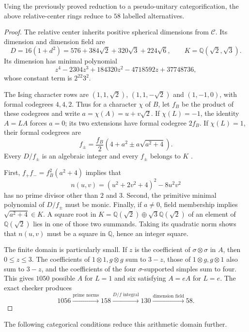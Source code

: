 \begin{proposition}\label{prop:1660-arithmetic-domain}
Using the previously proved reduction to a pseudo-unitary
categorification, the above relative-center rings reduce to $58$
labelled alternatives.
\end{proposition}
\begin{proof}
The relative center inherits positive spherical dimensions from
$\mathcal C$. Its dimension and dimension field are
\[
 D=16(1+d^2)=576+384\sqrt2+320\sqrt3+224\sqrt6,
 \qquad K=\mathbb Q(\sqrt2,\sqrt3).
\]
Its dimension has minimal polynomial
\[
 z^4-2304z^3+184320z^2-4718592z+37748736,
\]
whose constant term is $2^{22}3^2$.

The Ising character rows are $(1,1,\sqrt2)$, $(1,1,-\sqrt2)$ and
$(1,-1,0)$, with formal codegrees $4,4,2$. Thus for a character $\chi$
of $B$, let $f_B$ be the product of these codegrees and write
$a=\chi(A)=u+v\sqrt2$. If $\chi(L)=-1$, the identity $A=LA$ forces
$a=0$; its two extensions have formal codegree $2f_B$. If
$\chi(L)=1$, their formal codegrees are
\[
 f_\pm=\frac{f_B}{2}\left(4+a^2\pm a\sqrt{a^2+4}\right).
\]
Every $D/f_\pm$ is an algebraic integer and every $f_\pm$ belongs to
$K$ \cite[Corollaries 2.14--2.15]{Ostrik3}.

First, $f_+f_-=f_B^2(a^2+4)$ implies that
\[
 n(u,v)=(u^2+2v^2+4)^2-8u^2v^2
\]
has no prime divisor other than $2$ and $3$. Second, the primitive
minimal polynomial of $D/f_\pm$ must be monic. Finally, if $a\ne0$,
field membership implies $\sqrt{a^2+4}\in K$. A square root in
$K=\mathbb Q(\sqrt2)\oplus\sqrt3\mathbb Q(\sqrt2)$ of an element of
$\mathbb Q(\sqrt2)$ lies in one of those two summands. Taking its
quadratic norm shows that $n(u,v)$ must be a square in $\mathbb Q$,
hence an integer square.

The finite domain is particularly small. If $z$ is the coefficient of
$\sigma\otimes\sigma$ in $A$, then $0\le z\le3$. The coefficients
of $1\otimes1,g\otimes g$ sum to $3-z$, those of
$1\otimes g,g\otimes1$ also sum to $3-z$, and the coefficients of the
four $\sigma$-supported simples sum to four. This gives $1050$ possible
$A$ for $L=1$ and six satisfying $A=eA$ for $L=e$.
The exact checker produces
\[
1056\xrightarrow{\text{prime norms}}158
\xrightarrow{D/f\text{ integral}}130
\xrightarrow{\text{dimension field}}58.
\]
\end{proof}

The following categorical conditions reduce this arithmetic domain further.

